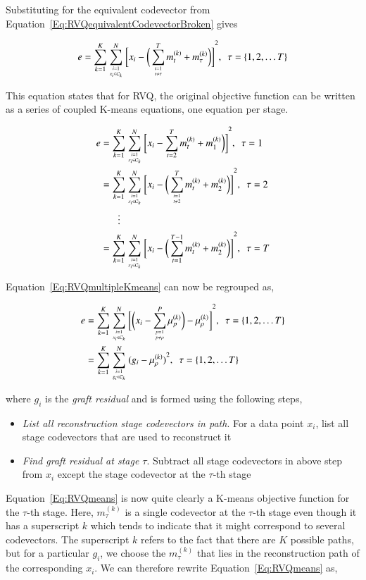 \begin{Body}
Substituting for the equivalent codevector from Equation~\ref{Eq:RVQequivalentCodevectorBroken} gives

\begin{equation}
e=\KmeansSum{\bigg[\RVQmultipleKmeans\bigg]}^2, \ \ \tau=\{1, 2, \ldots T\}
\label{Eq:RVQmultipleKmeans}
\end{equation}

This equation states that for RVQ, the original objective function can be written as a series of coupled K-means equations, one equation per stage.    
 
\begin{align}
e&= \KmeansSum{\bigg[\RVQmultipleKmeansone\bigg]}^2, \ \ \tau=1\notag\\
&= \KmeansSum{\bigg[\RVQmultipleKmeanstwo\bigg]}^2, \ \ \tau=2\notag\\
&\ \ \ \  \ \ \ \vdots\notag\\
&=\KmeansSum{\bigg[\RVQmultipleKmeansT\bigg]}^2, \ \ \tau=T
\end{align}

Equation~\ref{Eq:RVQmultipleKmeans} can now be regrouped as,

\begin{align}
\label{Eq:RVQmeans}
e&= \KmeansSum{\bigg[\RVQmultipleKmeansonealternate\bigg]}^2, \ \ \tau=\{1, 2, \ldots T\}\notag\\
&={\RVQerroralternate}, \ \ \tau=\{1, 2, \ldots T\}
\end{align}

where $g_i$ is the \emph{graft residual} and is formed using the following steps,

\begin{itemize}
\item \emph{List all reconstruction stage codevectors in path}.  For a data point $x_i$, list all stage codevectors that are used to reconstruct it
\item \emph{Find graft residual at stage $\tau$}.  Subtract all stage codevectors in above step from $x_i$ except the stage codevector at the $\tau$-th stage  
 \end{itemize}

Equation~\ref{Eq:RVQmeans} is now quite clearly a K-means objective function for the $\tau$-th stage.  Here, $m_{\tau}^{(k)}$ is a single codevector at the $\tau$-th stage even though it has a superscript $k$ which tends to indicate that it might correspond to several codevectors.  The superscript $k$ refers to the fact that there are $K$ possible paths, but for a particular $g_i$, we choose the $m_{\tau}^{(k)}$ that lies in the reconstruction path of the corresponding $x_i$.  We can therefore rewrite Equation~\ref{Eq:RVQmeans} as,


\end{Body}
